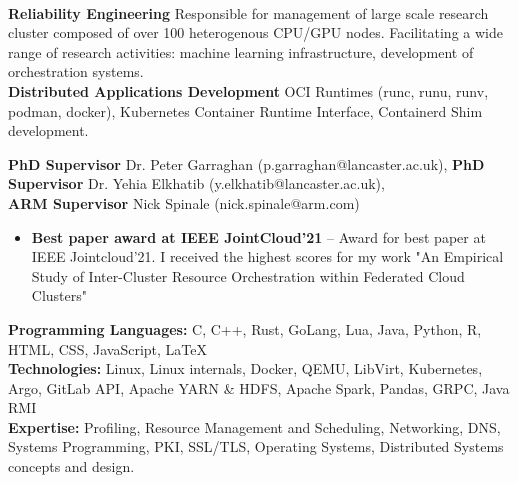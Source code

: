 \documentclass[10pt,a4paper]{base}
\begin{document}
\begin{fullwidth}
 \\
\begin{multicols}{2}
  \raggedcolumns
{}
\textbf{Reliability Engineering} Responsible for management of large scale research cluster composed of over 100 heterogenous CPU/GPU nodes. Facilitating a wide range of research activities: machine learning infrastructure, development of orchestration systems. \\
\textbf{Distributed Applications Development} OCI Runtimes (runc, runu, runv, podman, docker), Kubernetes Container Runtime Interface, Containerd Shim development. 

\small
\textcolor{accent}{\textbf{PhD Supervisor}} Dr. Peter Garraghan (p.garraghan@lancaster.ac.uk),
\textcolor{accent}{\textbf{PhD Supervisor}}  Dr. Yehia Elkhatib (y.elkhatib@lancaster.ac.uk), \\
\textcolor{accent}{\textbf{ARM Supervisor}}  Nick Spinale (nick.spinale@arm.com)

\columnbreak

\begin{itemize}
  \item \textbf{Best paper award at IEEE JointCloud'21} -- Award for best paper at IEEE Jointcloud'21. I received the highest scores for my work "An Empirical Study of Inter-Cluster Resource Orchestration within Federated Cloud Clusters"
\end{itemize}

\textbf{Programming Languages: } C, C++, Rust, GoLang, Lua, Java, Python, R, HTML, CSS, JavaScript, \LaTeX \\
\textbf{Technologies: } Linux, Linux internals, Docker, QEMU, LibVirt, Kubernetes, Argo, GitLab API, Apache YARN \& HDFS, Apache Spark, Pandas, GRPC, Java RMI\\
\textbf{Expertise: } Profiling, Resource Management and Scheduling, Networking, DNS, Systems Programming, PKI, SSL/TLS, Operating Systems, Distributed Systems concepts and design. \\
\vspace{1mm}
\end{multicols}


\end{fullwidth}
\end{document}
